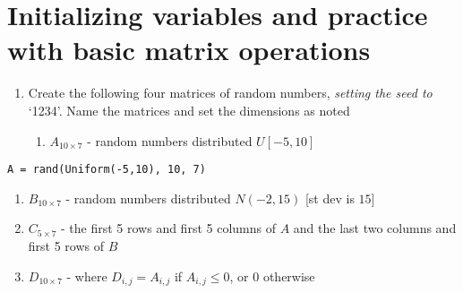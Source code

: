 \documentclass[11pt]{article}
\begin{document}
\section{Initializing variables and practice with basic matrix operations}
\label{sec:org573e9a8}

\begin{enumerate}
\item Create the following four matrices of random numbers, \emph{setting the seed to} `1234'. Name the matrices and set the dimensions as noted
\begin{enumerate}
\item \(A_{10\times7}\) - random numbers distributed \(U\left[-5,10\right]\)
\end{enumerate}
\end{enumerate}

\begin{verbatim}
A = rand(Uniform(-5,10), 10, 7)
\end{verbatim}

\begin{enumerate}
\item \(B_{10\times7}\) - random numbers distributed \(N\left(-2,15\right)\) [st dev is \(15\)]
\item \(C_{5\times7}\) - the first 5 rows and first 5 columns of \(A\) and the last two columns and first 5 rows of \(B\)
\item \(D_{10\times7}\) - where \(D_{i,j}=A_{i,j}\) if \(A_{i,j}\leq0\), or \(0\) otherwise
\end{enumerate}
\end{document}
